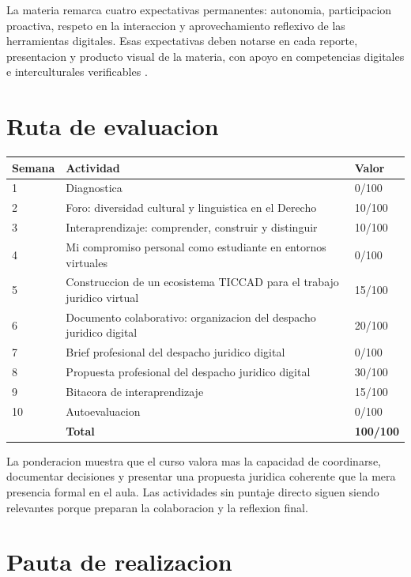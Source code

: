 \documentclass[
  spanish,
  letterpaper, oneside
]{article}
\begin{document}
La materia remarca cuatro expectativas permanentes: autonomia, participacion
proactiva, respeto en la interaccion y aprovechamiento reflexivo de las
herramientas digitales. Esas expectativas deben notarse en cada reporte,
presentacion y producto visual de la materia, con apoyo en competencias digitales
e interculturales verificables \citep{unescoDigitalLiteracy2018,unescoInterculturalCompetences2013}.

\section{Ruta de evaluacion}

\begin{longtable}{p{1.2cm}p{9.0cm}p{2.0cm}}
\textbf{Semana} & \textbf{Actividad} & \textbf{Valor} \\
\hline
1 & Diagnostica & 0/100 \\
2 & Foro: diversidad cultural y linguistica en el Derecho & 10/100 \\
3 & Interaprendizaje: comprender, construir y distinguir & 10/100 \\
4 & Mi compromiso personal como estudiante en entornos virtuales & 0/100 \\
5 & Construccion de un ecosistema TICCAD para el trabajo juridico virtual & 15/100 \\
6 & Documento colaborativo: organizacion del despacho juridico digital & 20/100 \\
7 & Brief profesional del despacho juridico digital & 0/100 \\
8 & Propuesta profesional del despacho juridico digital & 30/100 \\
9 & Bitacora de interaprendizaje & 15/100 \\
10 & Autoevaluacion & 0/100 \\
\hline
 & \textbf{Total} & \textbf{100/100} \\
\end{longtable}

La ponderacion muestra que el curso valora mas la capacidad de coordinarse,
documentar decisiones y presentar una propuesta juridica coherente que la mera
presencia formal en el aula. Las actividades sin puntaje directo siguen siendo
relevantes porque preparan la colaboracion y la reflexion final.

\section{Pauta de realizacion}
\end{document}
